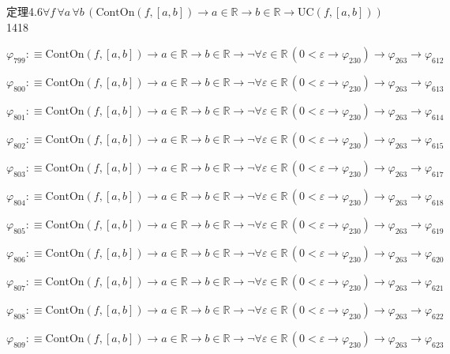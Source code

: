 \begin{fullproof}{定理4.6}{$\forall f\,\forall a\,\forall b\,(\mathrm{ContOn}(f,[a,b]) \to a \in \mathbb{R} \to b \in \mathbb{R} \to \mathrm{UC}(f,[a,b]))$}{1418}
\begin{abbrevlist}
\item $\varphi_{799} :\equiv \mathrm{ContOn}(f,[a,b]) \to a \in \mathbb{R} \to b \in \mathbb{R} \to \neg \forall \varepsilon \in \mathbb{R}\,(0 < \varepsilon \to \varphi_{230}) \to \varphi_{263} \to \varphi_{612}$
\item $\varphi_{800} :\equiv \mathrm{ContOn}(f,[a,b]) \to a \in \mathbb{R} \to b \in \mathbb{R} \to \neg \forall \varepsilon \in \mathbb{R}\,(0 < \varepsilon \to \varphi_{230}) \to \varphi_{263} \to \varphi_{613}$
\item $\varphi_{801} :\equiv \mathrm{ContOn}(f,[a,b]) \to a \in \mathbb{R} \to b \in \mathbb{R} \to \neg \forall \varepsilon \in \mathbb{R}\,(0 < \varepsilon \to \varphi_{230}) \to \varphi_{263} \to \varphi_{614}$
\item $\varphi_{802} :\equiv \mathrm{ContOn}(f,[a,b]) \to a \in \mathbb{R} \to b \in \mathbb{R} \to \neg \forall \varepsilon \in \mathbb{R}\,(0 < \varepsilon \to \varphi_{230}) \to \varphi_{263} \to \varphi_{615}$
\item $\varphi_{803} :\equiv \mathrm{ContOn}(f,[a,b]) \to a \in \mathbb{R} \to b \in \mathbb{R} \to \neg \forall \varepsilon \in \mathbb{R}\,(0 < \varepsilon \to \varphi_{230}) \to \varphi_{263} \to \varphi_{617}$
\item $\varphi_{804} :\equiv \mathrm{ContOn}(f,[a,b]) \to a \in \mathbb{R} \to b \in \mathbb{R} \to \neg \forall \varepsilon \in \mathbb{R}\,(0 < \varepsilon \to \varphi_{230}) \to \varphi_{263} \to \varphi_{618}$
\item $\varphi_{805} :\equiv \mathrm{ContOn}(f,[a,b]) \to a \in \mathbb{R} \to b \in \mathbb{R} \to \neg \forall \varepsilon \in \mathbb{R}\,(0 < \varepsilon \to \varphi_{230}) \to \varphi_{263} \to \varphi_{619}$
\item $\varphi_{806} :\equiv \mathrm{ContOn}(f,[a,b]) \to a \in \mathbb{R} \to b \in \mathbb{R} \to \neg \forall \varepsilon \in \mathbb{R}\,(0 < \varepsilon \to \varphi_{230}) \to \varphi_{263} \to \varphi_{620}$
\item $\varphi_{807} :\equiv \mathrm{ContOn}(f,[a,b]) \to a \in \mathbb{R} \to b \in \mathbb{R} \to \neg \forall \varepsilon \in \mathbb{R}\,(0 < \varepsilon \to \varphi_{230}) \to \varphi_{263} \to \varphi_{621}$
\item $\varphi_{808} :\equiv \mathrm{ContOn}(f,[a,b]) \to a \in \mathbb{R} \to b \in \mathbb{R} \to \neg \forall \varepsilon \in \mathbb{R}\,(0 < \varepsilon \to \varphi_{230}) \to \varphi_{263} \to \varphi_{622}$
\item $\varphi_{809} :\equiv \mathrm{ContOn}(f,[a,b]) \to a \in \mathbb{R} \to b \in \mathbb{R} \to \neg \forall \varepsilon \in \mathbb{R}\,(0 < \varepsilon \to \varphi_{230}) \to \varphi_{263} \to \varphi_{623}$

\end{abbrevlist}
\end{fullproof}

